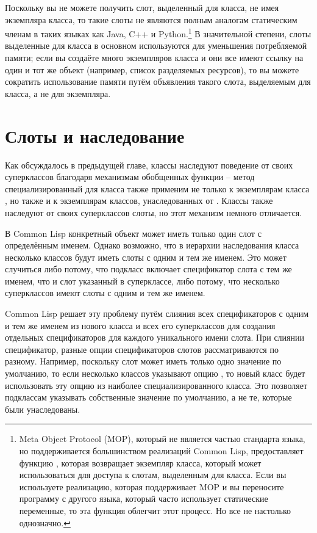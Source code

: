 Поскольку вы не можете получить слот, выделенный для класса, не имея экземпляра класса, то
такие слоты не являются полным аналогам статическим членам в таких языках как Java, C++ и
Python.\footnote{Meta Object Protocol (MOP), который не является частью стандарта языка,
  но поддерживается большинством реализаций Common Lisp, предоставляет функцию
  , которая возвращает экземпляр класса, который может
  использоваться для доступа к слотам, выделенным для класса.  Если вы используете
  реализацию, которая поддерживает MOP и вы переносите программу с другого языка, который
  часто использует статические переменные, то эта функция облегчит этот процесс.  Но все
  не настолько однозначно.}  В значительной степени, слоты выделенные для класса в
основном используются для уменьшения потребляемой памяти; если вы создаёте много
экземпляров класса и они все имеют ссылку на один и тот же объект (например, список
разделяемых ресурсов), то вы можете сократить использование памяти путём объявления такого
слота, выделяемым для класса, а не для экземпляра.

\section{Слоты и наследование}

Как обсуждалось в предыдущей главе, классы наследуют поведение от своих суперклассов
благодаря механизмам обобщенных функции -- метод специализированный для класса 
также применим не только к экземплярам класса , но также и к экземплярам классов,
унаследованных от .  Классы также наследуют от своих суперклассов слоты, но этот
механизм немного отличается.

В Common Lisp конкретный объект может иметь только один слот с определённым именем.
Однако возможно, что в иерархии наследования класса несколько классов будут иметь слоты с
одним и тем же именем.  Это может случиться либо потому, что подкласс включает
спецификатор слота с тем же именем, что и слот указанный в суперклассе, либо потому, что
несколько суперклассов имеют слоты с одним и тем же именем.

Common Lisp решает эту проблему путём слияния всех спецификаторов с одним и тем же именем
из нового класса и всех его суперклассов для создания отдельных спецификаторов для каждого
уникального имени слота.  При слиянии спецификатор, разные опции спецификаторов слотов
рассматриваются по разному.  Например, поскольку слот может иметь только одно значение по
умолчанию, то если несколько классов указывают опцию , то новый класс
будет использовать эту опцию из наиболее специализированного класса.  Это позволяет
подклассам указывать собственные значение по умолчанию, а не те, которые были
унаследованы.


